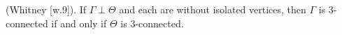 (Whitney [w.9]). If $\Gamma \perp \Theta$ and each are without isolated vertices, then $\Gamma$ is 3-connected if and only if $\Theta$ is 3-connected.
